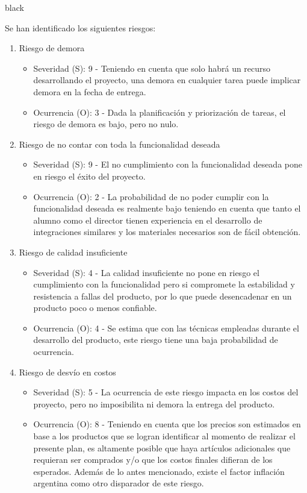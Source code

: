 \documentclass[
11pt, %
]{charter}
\begin{document}
\begin{consigna}{black}

Se han identificado los siguientes riesgos:


\begin{enumerate}

\item Riesgo de demora
\begin{itemize}
	\item Severidad (S): 9 - Teniendo en cuenta que solo habrá un recurso desarrollando el proyecto, una demora en cualquier tarea puede implicar demora en la fecha de entrega.
	\item Ocurrencia (O): 3 - Dada la planificación y priorización de tareas, el riesgo de demora es bajo, pero no nulo.
\end{itemize}


\item Riesgo de no contar con toda la funcionalidad deseada
\begin{itemize}
	\item Severidad (S): 9 - El no cumplimiento con la funcionalidad deseada pone en riesgo el éxito del proyecto.
	\item Ocurrencia (O): 2 - La probabilidad de no poder cumplir con la funcionalidad deseada es realmente bajo teniendo en cuenta que tanto el alumno como el director tienen experiencia en el desarrollo de integraciones similares y los materiales necesarios son de fácil obtención.
\end{itemize}

\item Riesgo de calidad insuficiente
\begin{itemize}
	\item Severidad (S): 4 - La calidad insuficiente no pone en riesgo el cumplimiento con la funcionalidad pero si compromete la estabilidad y resistencia a fallas del producto, por lo que puede desencadenar en un producto poco o menos confiable.
	\item Ocurrencia (O): 4 - Se estima que con las técnicas empleadas durante el desarrollo del producto, este riesgo tiene una baja probabilidad de ocurrencia.
\end{itemize}


\item Riesgo de desvío en costos
\begin{itemize}
	\item Severidad (S): 5 - La ocurrencia de este riesgo impacta en los costos del proyecto, pero no imposibilita ni demora la entrega del producto.
	\item Ocurrencia (O): 8 - Teniendo en cuenta que los precios son estimados en base a los productos que se logran identificar al momento de realizar el presente plan, es altamente posible que haya artículos adicionales que requieran ser comprados y/o que los costos finales difieran de los esperados. Además de lo antes mencionado, existe el factor inflación argentina como otro disparador de este riesgo.
\end{itemize}


\end{enumerate}
\end{consigna}
\end{document}
